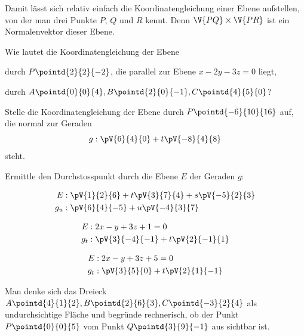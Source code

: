 \documentclass[%
11pt,%
twoside,%
titlepage,%
german,%
headsepline%
]{scrartcl}
\begin{document}
\begin{bem}
Damit lässt sich relativ einfach die Koordinatengleichung einer Ebene aufstellen, von der man drei Punkte $P$, $Q$ und $R$ kennt. Denn $\V{PQ}\times\V{PR}$ ist ein Normalenvektor dieser Ebene.
\end{bem}

\begin{ueb}
Wie
lautet die Koordinatengleichung der Ebene
\begin{enumeratea}
\item durch $P\pointd{2}{ 2}{-2}$, die parallel zur Ebene $x- 2y- 3z=0$ liegt,
\item durch $A\pointd{0}{0}{4}, B\pointd{2}{0}{-1}, C\pointd{4}{5}{0}$?
\end{enumeratea}
\end{ueb}

\begin{ueb}[Koordinatengleichung]
Stelle die Koordinatengleichung der Ebene durch
 $P\pointd{-6}{10}{16}$ auf, die normal zur Geraden
$$g:\pV{6}{4}{0}+t\pV{-8}{4}{8}$$
steht.
\end{ueb}

\begin{ueb}[Durchstosspunkt]
Ermittle den Durchstosspunkt durch die Ebene $E$ der Geraden $g$:
\begin{enumeratea}
\item \begin{align*}E&:\pV{1}{2}{6}+t\pV{3}{7}{4}+s\pV{-5}{2}{3}\\g_u&:\pV{6}{4}{-5}+u\pV{-4}{3}{7}\end{align*}
\item \begin{align*}E&:2x-y+3z+1=0\\ g_t&:\pV{3}{-4}{-1}+t\pV{2}{-1}{1}\end{align*}
\item \begin{align*}E&:2x-y+3z+5=0\\ g_t&:\pV{3}{5}{0}+t\pV{2}{1}{-1}\end{align*}
\end{enumeratea}
\end{ueb}

\begin{ueb}[sichtbar?]
Man denke sich das Dreieck $A\pointd{4}{1}{2}, B\pointd{2}{6}{3}, C\pointd{-3}{2}{4}$ als undurchsichtige Fläche und begründe rechnerisch, ob der Punkt $P\pointd{0}{0}{5}$ vom Punkt $Q\pointd{3}{9}{-1}$ aus sichtbar ist.
\end{ueb}
\end{document}
